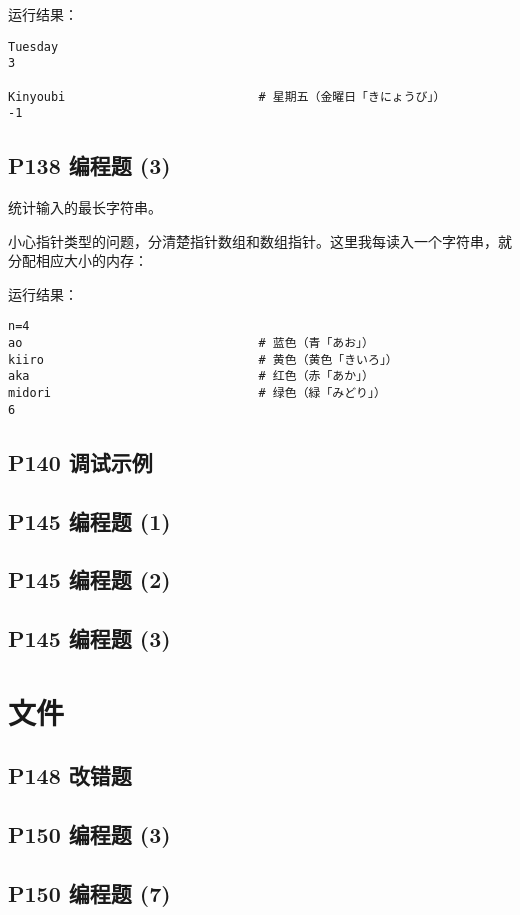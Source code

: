 \documentclass[cs4size,a4paper,nofonts]{ctexart}
\begin{document}
运行结果：
\begin{verbatim}
Tuesday
3

Kinyoubi                           # 星期五（金曜日「きにょうび」）
-1
\end{verbatim}

\subsection{P138 编程题 (3)}

统计输入的最长字符串。

小心指针类型的问题，分清楚指针数组和数组指针。这里我每读入一个字符串，就分配相应大小的内存：


运行结果：
\begin{verbatim}
n=4
ao                                 # 蓝色（青「あお」）
kiiro                              # 黄色（黄色「きいろ」）
aka                                # 红色（赤「あか」）
midori                             # 绿色（緑「みどり」）
6
\end{verbatim}

\subsection{P140 调试示例}
\subsection{P145 编程题 (1)}
\subsection{P145 编程题 (2)}
\subsection{P145 编程题 (3)}

\section{文件}

\subsection{P148 改错题}
\subsection{P150 编程题 (3)}
\subsection{P150 编程题 (7)}

\end{document}
